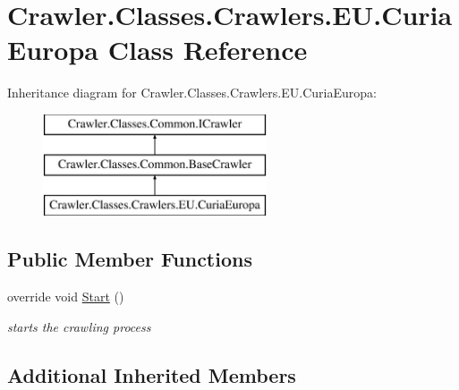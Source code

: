 \hypertarget{class_crawler_1_1_classes_1_1_crawlers_1_1_e_u_1_1_curia_europa}{\section{Crawler.\-Classes.\-Crawlers.\-E\-U.\-Curia\-Europa Class Reference}
\label{class_crawler_1_1_classes_1_1_crawlers_1_1_e_u_1_1_curia_europa}
}
Inheritance diagram for Crawler.\-Classes.\-Crawlers.\-E\-U.\-Curia\-Europa\-:\begin{figure}[H]
\begin{center}
\leavevmode
\includegraphics[height=3.000000cm]{class_crawler_1_1_classes_1_1_crawlers_1_1_e_u_1_1_curia_europa}
\end{center}
\end{figure}
\subsection*{Public Member Functions}
\begin{DoxyCompactItemize}
\item 
override void \hyperlink{class_crawler_1_1_classes_1_1_crawlers_1_1_e_u_1_1_curia_europa_a4b2e192e6a1ffeefd1c0b1dac642324f}{Start} ()
\begin{DoxyCompactList}\small\item\em starts the crawling process \end{DoxyCompactList}\end{DoxyCompactItemize}
\subsection*{Additional Inherited Members}


